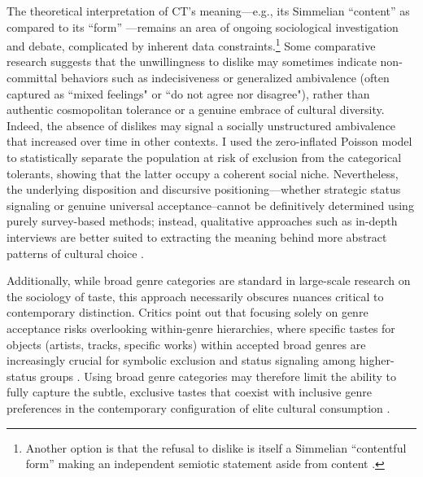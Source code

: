 \documentclass[12pt]{article}
\begin{document}
The theoretical interpretation of CT's meaning---e.g., its Simmelian ``content'' as compared to its ``form'' \citep{sonnett2004musical-961}---remains an area of ongoing sociological investigation and debate, complicated by inherent data constraints.\footnote{Another option is that the refusal to dislike is itself a Simmelian ``contentful form'' making an independent semiotic statement aside from content \citep{lizardo2019simmels-fc9}.} Some comparative research suggests that the unwillingness to dislike may sometimes indicate non-committal behaviors such as indecisiveness or generalized ambivalence (often captured as ``mixed feelings" or ``do not agree nor disagree"), rather than authentic cosmopolitan tolerance or a genuine embrace of cultural diversity. Indeed, the absence of dislikes may signal a socially unstructured ambivalence that increased over time in other contexts. I used the zero-inflated Poisson model to statistically separate the population at risk of exclusion from the categorical tolerants, showing that the latter occupy a coherent social niche. Nevertheless, the underlying disposition and discursive positioning---whether strategic status signaling or genuine universal acceptance--cannot be definitively determined using purely survey-based methods; instead, qualitative approaches such as in-depth interviews are better suited to extracting the meaning behind more abstract patterns of cultural choice \citep{atkinson2011context-d44, jarness2017im-001, lamont2014methodological-9f4}.

Additionally, while broad genre categories are standard in large-scale research on the sociology of taste, this approach necessarily obscures nuances critical to contemporary distinction. Critics point out that focusing solely on genre acceptance risks overlooking within-genre hierarchies, where specific tastes for objects (artists, tracks, specific works) within accepted broad genres are increasingly crucial for symbolic exclusion and status signaling among higher-status groups \citep{childress2019encultured-e58, nault2021social-1bf}. Using broad genre categories may therefore limit the ability to fully capture the subtle, exclusive tastes that coexist with inclusive genre preferences in the contemporary configuration of elite cultural consumption \citep{lizardo2024from-ddd}.
\end{document}
